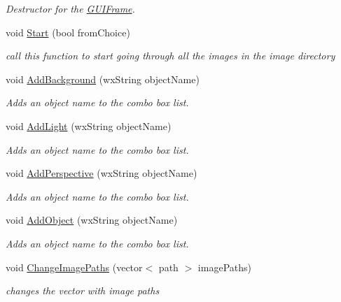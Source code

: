 \begin{DoxyCompactItemize}
\begin{DoxyCompactList}\small\item\em Destructor for the \hyperlink{classGUIFrame}{GUIFrame}. \item\end{DoxyCompactList}\item 
void \hyperlink{classGUIFrame_a04e84d12e09fed8dd54c3da03523d63b}{Start} (bool fromChoice)
\begin{DoxyCompactList}\small\item\em call this function to start going through all the images in the image directory \item\end{DoxyCompactList}\item 
void \hyperlink{classGUIFrame_a82152338d63b02ae13dd0c730952597e}{AddBackground} (wxString objectName)
\begin{DoxyCompactList}\small\item\em Adds an object name to the combo box list. \item\end{DoxyCompactList}\item 
void \hyperlink{classGUIFrame_a75643ca5989ef8b36e298a2bc7336e39}{AddLight} (wxString objectName)
\begin{DoxyCompactList}\small\item\em Adds an object name to the combo box list. \item\end{DoxyCompactList}\item 
void \hyperlink{classGUIFrame_a7af502332b03c82f05db96ce418f54bc}{AddPerspective} (wxString objectName)
\begin{DoxyCompactList}\small\item\em Adds an object name to the combo box list. \item\end{DoxyCompactList}\item 
void \hyperlink{classGUIFrame_ae27c764797d05c19e1e61d079213c946}{AddObject} (wxString objectName)
\begin{DoxyCompactList}\small\item\em Adds an object name to the combo box list. \item\end{DoxyCompactList}\item 
void \hyperlink{classGUIFrame_acf98409e53ab4dfe4f51f381d66360a8}{ChangeImagePaths} (vector$<$ path $>$ imagePaths)
\begin{DoxyCompactList}\small\item\em changes the vector with image paths \item\end{DoxyCompactList}\item 

\end{DoxyCompactItemize}
